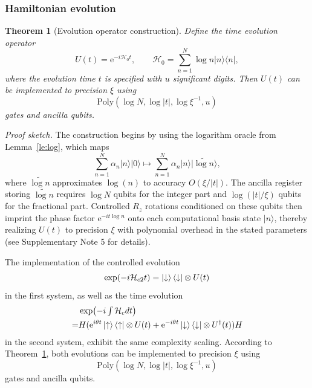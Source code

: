 \documentclass[aps,pra,twocolumn,superscriptaddress,preprintnumbers,amsmath,amssymb]{revtex4-2}
\newtheorem{Theorem}{Theorem}
\begin{document}
\subsubsection{Hamiltonian evolution}
\begin{Theorem}[Evolution operator construction]\label{Theorem:H}
    Define the time evolution operator
    \begin{equation}
        U(t)=\mathrm{e}^{-i\mathcal{H}_0t}, \qquad \mathcal{H}_0=\sum_{n=1}^{N}\log n|n\rangle\langle n|,
    \end{equation}
    where the evolution time $t$ is specified with $u$ significant digits. Then $U(t)$ can be implemented to precision $\xi$ using 
    \begin{equation}
        \mathrm{Poly}(\log N,\log |t|,\log\xi^{-1},u)
    \end{equation}
 gates and  ancilla qubits.
\end{Theorem}
\emph{Proof sketch.}  The construction begins by using the logarithm oracle from Lemma~\ref{le:log}, which maps 
\begin{equation}
    \textstyle\sum\limits_{n=1}^{N} \alpha_n|n\rangle|0\rangle \mapsto \textstyle\sum\limits_{n=1}^{N}\alpha_n|n\rangle|\widetilde{\log n}\rangle, 
\end{equation}
where $\widetilde{\log n}$ approximates $\log(n)$ to accuracy $O(\xi/|t|)$. The ancilla register storing $\widetilde{\log n}$ requires $\log N$ qubits for the integer part and $\log(|t|/\xi)$ qubits for the fractional part.  Controlled $R_z$ rotations conditioned on these qubits then imprint the phase factor $\mathrm{e}^{-it\log n}$ onto each computational basis state $|n\rangle$, thereby realizing $U(t)$ to precision $\xi$ with polynomial overhead in the stated parameters (see Supplementary Note 5 for details).\par
The implementation of  the controlled evolution
\begin{equation}
\exp(-i\mathcal{H}_{c2}t)
=\ket{\downarrow}\bra{\downarrow} \otimes U(t)
\end{equation}
in the first system, as well as the time evolution 
\begin{align}
       &\exp(-i\textstyle\int\mathcal{H}_{c}dt)\notag\\
     =&H(\mathrm{e}^{i\theta t}\ket{\uparrow}\bra{\uparrow} \otimes U(t)+\mathrm{e}^{-i\theta t}\ket{\downarrow}\bra{\downarrow} \otimes U^\dagger(t))H  
\end{align}
in the second system, exhibit the same complexity scaling. 
According to Theorem~\ref{Theorem:H}, both evolutions can be implemented to precision $\xi$ using
\begin{equation}
 \mathrm{Poly}\left(\log N, \log |t|, \log \xi^{-1}, u\right) 
\end{equation}
gates and  ancilla qubits.
\end{document}
